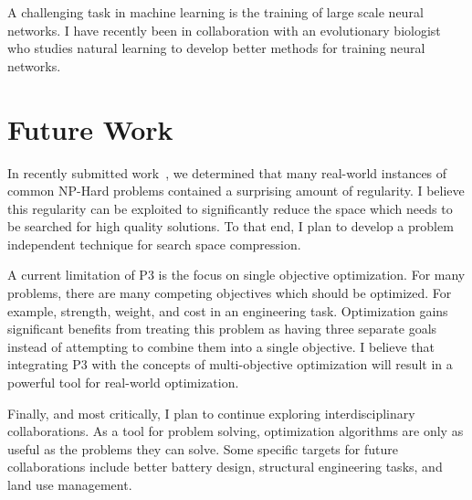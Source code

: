 \documentclass[a4paper, 11pt]{article}
\begin{document}
A challenging task in machine learning is the training of large scale neural networks.
I have recently been in collaboration with an evolutionary biologist
who studies natural learning to develop better methods for training neural networks.

\section{Future Work}
In recently submitted work~\cite{whitley:2016:mkl}, we determined that many real-world
instances of common NP-Hard problems contained a surprising amount of regularity.
I believe this regularity can be exploited to significantly reduce the space
which needs to be searched for high quality solutions. To that end, I plan to develop
a problem independent technique for search space compression.

A current limitation of P3 is the focus on single objective optimization. For many
problems, there are many competing objectives which should be optimized. For example,
strength, weight, and cost in an engineering task. Optimization gains significant
benefits from treating this problem as having three separate goals instead of attempting
to combine them into a single objective. I believe that integrating P3 with the concepts
of multi-objective optimization will result in a powerful tool for real-world optimization.

Finally, and most critically, I plan to continue exploring interdisciplinary collaborations.
As a tool for problem solving, optimization algorithms are only as useful as the problems they
can solve. Some specific targets for future collaborations include better battery design,
structural engineering tasks, and land use management.




\small



\end{document}
